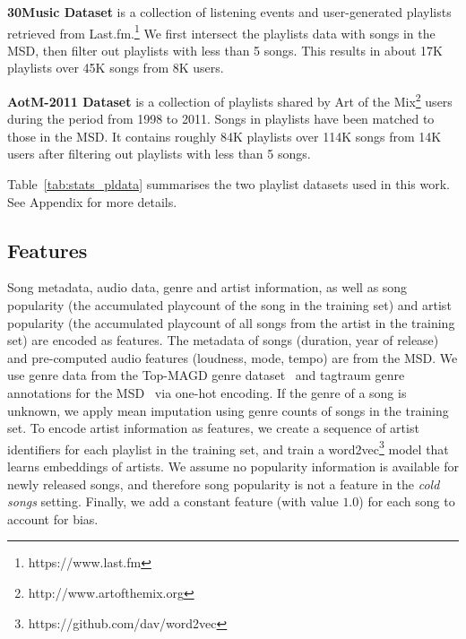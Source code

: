 %

\noindent
{\bf 30Music Dataset} is a collection of listening events and user-generated
playlists retrieved from Last.fm.\footnote{https://www.last.fm}
We first intersect the playlists data with songs in the MSD, 
then filter out playlists with less than 5 songs.
This results in about 17K playlists over 45K songs from 8K users.

\noindent
{\bf AotM-2011 Dataset} is a collection of playlists shared by Art of the Mix\footnote{http://www.artofthemix.org} 
users during the period from 1998 to 2011. Songs in playlists have been matched to those in the MSD.
It contains 
roughly 84K playlists over 114K songs from 14K users
after filtering out playlists with less than 5 songs.

Table~\ref{tab:stats_pldata} summarises the two 
playlist datasets used in this work.
See Appendix for more details.


\subsection{Features}

Song metadata, audio data, genre and artist information, as well as song popularity
(\ie the accumulated playcount of the song in the training set)
and artist popularity 
(\ie the accumulated playcount of all songs from the artist in the training set)
are encoded as features.
%
The metadata of songs (\eg duration, year of release) and pre-computed audio features (\eg loudness, mode, tempo) are from the MSD.
We use genre data from the Top-MAGD genre dataset~\cite{schindler2012facilitating}
and tagtraum genre annotations for the MSD~\cite{schreiber2015improving} via one-hot encoding.
If the genre of a song is unknown, 
we apply mean imputation using genre counts of songs in the training set.
To encode artist information as features,
we create a sequence of artist identifiers for each playlist in the training set, and train
a word2vec\footnote{https://github.com/dav/word2vec} model that learns embeddings of artists.
%
We assume no popularity information is available for newly released songs,
and therefore song popularity is not a feature in the \emph{cold songs} setting.
Finally, we add a constant feature (with value $1.0$) for each song to account for bias.


